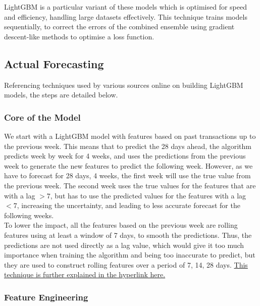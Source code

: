 \documentclass[12pt]{article}
\begin{document}
\noindent LightGBM is a particular variant of these models which is optimised for speed and efficiency, handling large datasets effectively. This technique trains models sequentially, to correct the errors of the combined ensemble using gradient descent-like methods to optimise a loss function. 

\subsection*{Actual Forecasting}

Referencing techniques used by various sources online on building LightGBM models, the steps are detailed below. 

\subsubsection*{Core of the Model}

We start with a LightGBM model with features based on past transactions up to the previous week. This means that to predict the 28 days ahead, the algorithm predicts week by week for 4 weeks, and uses the predictions from the previous week to generate the new features to predict the following week. However, as we have to forecast for 28 days, 4 weeks, the first week will use the true value from the previous week. The second week uses the true values for the features that are with a lag $> 7$, but has to use the predicted values for the features with a lag $< 7$, increasing the uncertainty, and leading to less accurate forecast for the following weeks. \\ 

\noindent To lower the impact, all the features based on the previous week are rolling features using at least a window of 7 days, to smooth the predictions. Thus, the predictions are not used directly as a lag value, which would give it too much importance when training the algorithm and being too inaccurate to predict, but they are used to construct rolling features over a period of 7, 14, 28 days. \href{https://www.christophenicault.com/post/m5_forecasting_accuracy}{This technique is further explained in the hyperlink here.}

\subsubsection*{Feature Engineering}
\end{document}

